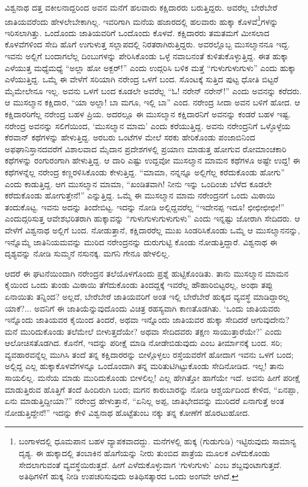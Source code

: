 ವಿಶ್ವನಾಥ ದತ್ತ ವಕೀಲನಾದ್ದರಿಂದ ಅವನ ಮನೆಗೆ ಹಲವಾರು ಕಕ್ಷಿದಾರರು ಬರುತ್ತಿದ್ದರು. ಅವರೆಲ್ಲ ಬೇರೆಬೇರೆ ಜಾತಿಯವರೆಂದು ಹೇಳಲೇಬೇಕಾಗಿಲ್ಲ. ಇವರಿಗಾಗಿ ಮನೆಯ ಹಜಾರದಲ್ಲಿ ಹಲವಾರು ಹುಕ್ಕಾ ಕೊಳವೆ\footnote{ಬಂಗಾಳದಲ್ಲಿ ಧೂಮಪಾನ ಬಹಳ ವ್ಯಾಪಕವಾದದ್ದು. ಮನೆಗಳಲ್ಲಿ ಹುಕ್ಕ (ಗುಡುಗುಡಿ) ಇಟ್ಟಿರುವುದು ಸಾಮಾನ್ಯ ದೃಶ್ಯ. ಈ ಹುಕ್ಕಾದಲ್ಲಿ ತಂಬಾಕಿನ ಹೊಗೆಯನ್ನು ನೀರು ತುಂಬಿದ ಪಾತ್ರೆಯ ಮೂಲಕ ಎಳೆದುಕೊಂಡು ಸೇದಲಾಗುವಂತೆ ವ್ಯವಸ್ಥೆಯಿರುತ್ತದೆ. ಹೀಗೆ ಎಳೆದುಕೊಳ್ಳುವಾಗ `ಗುಳುಗುಳು' ಎಂಬ ಶಬ್ದವುಂಟಾಗುತ್ತದೆ. ಅತಿಥಿಗಳಿಗೆ ಹುಕ್ಕ ನೀಡಿ ಉಪಚರಿಸುವುದು ಅತಿಥಿಸತ್ಕಾರದ ಒಂದು ಅಂಗವೇ ಆಗಿದೆ.}ಗಳನ್ನು ಇರಿಸಲಾಗಿತ್ತು. ಒಂದೊಂದು ಜಾತಿಯವರಿಗೆ ಒಂದೊಂದು ಕೊಳವೆ. ಕಕ್ಷಿದಾರರು ತಮತಮಗೆ ಮೀಸಲಾದ ಕೊಳವೆಗಳಿಂದ ಸೇದಿ ಹೊಗೆ ಉಗುಳುತ್ತ ಸಲ್ಲಾಪದಲ್ಲಿ ನಿರತರಾಗಿರುತ್ತಿದ್ದರು. ಅವರಲ್ಲೊಬ್ಬ ಮುಸಲ್ಮಾನನೂ ಇದ್ದ. ಇವನು ಅಲ್ಲಿಗೆ ಬಂದಾಗಲೆಲ್ಲ ದಿಂಬುಗಳನ್ನು ಪೇರಿಸಿಕೊಂಡು ಒಳ್ಳೆ ನವಾಬನಂತೆ ಕುಳಿತುಕೊಳ್ಳುತ್ತಿದ್ದ. ಈತ ಹುಕ್ಕಾ ಎಳೆಯುತ್ತ ಮಧ್ಯೆಮಧ್ಯೆ “ಅಲ್ಲಾ ಹೋ ಅಕ್ಬರ್!” ಎಂದು ಉದ್ಗರಿಸಿ ಬಳಿಕ ಮತ್ತೆ “ಗುಳುಗುಳುಗುಳು” ಎಂದು ಹುಕ್ಕಾ ಎಳೆಯುತ್ತಿದ್ದ. ಒಮ್ಮೆ ಈ ವೇಳೆಗೆ ಸರಿಯಾಗಿ ನರೇಂದ್ರ ಒಳಗೆ ಬಂದ. ಸೊಂಟಕ್ಕೆ ಸುತ್ತಿದ ಪುಟ್ಟ ಧೋತಿ ಬಿಟ್ಟರೆ ಮೈಮೇಲೇನೂ ಇಲ್ಲ. ಅವನು ಒಳಗೆ ಬಂದ ಕೂಡಲೇ ಅವರೆಲ್ಲ “ಓ! ನರೇನ್ ನರೇನ್!” ಎಂದು ಅವನನ್ನು ಕರೆದರು. ಆ ಮುಸಲ್ಮಾನ ಕಕ್ಷಿದಾರ, “ಯಾ ಅಲ್ಲಾ! ಬಾ ಮಗೂ, ಇಲ್ಲಿ ಬಾ” ಎಂದ. ನರೇಂದ್ರ ಸೀದಾ ಅವನ ಬಳಿಗೆ ಹೋದ. ಆ ಕಕ್ಷಿದಾರರಿಗೆಲ್ಲ ನರೇಂದ್ರ ಬಹಳ ಪ್ರಿಯ. ಅದರಲ್ಲೂ ಈ ಮುಸಲ್ಮಾನ ಕಕ್ಷಿದಾರನಿಗೆ ಅವನನ್ನು ಕಂಡರೆ ಬಹಳ ಇಷ್ಟ. ನರೇಂದ್ರ ಅವನನ್ನು ಸಲಿಗೆಯಿಂದ, ‘ಮುಸಲ್ಮಾನ ಮಾಮ’ ಎಂದು ಕರೆಯುತ್ತಿದ್ದ. ಅವನು ನರೇಂದ್ರನಿಗೆ ಒಳ್ಳೊಳ್ಳೆಯ ಕೆರವಾನ್ ಕಥೆಗಳನ್ನು ಹೇಳುತ್ತಿದ್ದ. ಅರಬರು ಒಂಟೆಗಳ ಮೇಲೆ ಸರಕು ಹೇರಿಕೊಂಡು ಪಂಜಾಬಿನಿಂದ ಅಫಘಾನಿಸ್ತಾನದವರೆಗೆ ವಿಶಾಲವಾದ ಮೈದಾನ ಪ್ರದೇಶಗಳಲ್ಲಿ ಪ್ರಯಾಣ ಮಾಡುತ್ತ ಹೋಗುವ ರೋಮಾಂಚಕಾರಿ ಕಥೆಗಳನ್ನು ರಂಗುರಂಗಾಗಿ ಹೇಳುತ್ತಿದ್ದ. ಆ ದಾರಿ ಎಷ್ಟು ಉದ್ದವೋ ಮುಸಲ್ಮಾನ ಮಾಮನ ಕಥೆಗಳೂ ಅಷ್ಟೇ ಉದ್ದ! ಈ ಕಥೆಗಳನ್ನೆಲ್ಲ ನರೇಂದ್ರ ಕಣ್ಣರಳಿಸಿಕೊಂಡು ಕೇಳುತ್ತಿದ್ದ. “ಮಾಮಾ, ನನ್ನನ್ನೂ ಅಲ್ಲಿಗೆಲ್ಲ ಕರೆದುಕೊಂಡು ಹೋಗು” ಎಂದು ಕಾಡುತ್ತಿದ್ದ. ಆಗ ಮುಸಲ್ಮಾನ ಮಾಮಾ, “ಖಂಡಿತವಾಗಿ! ನೀನು ಇನ್ನು ಒಂದಿಂಚು ಬೆಳೆದ ಕೂಡಲೇ ಕರೆದುಕೊಂಡು ಹೋಗುತ್ತೇನೆ!” ಎನ್ನುತ್ತಿದ್ದ. ಒಮ್ಮೆ ಈ ಮುಸಲ್ಮಾನ ಮಾಮ ನರೇಂದ್ರನಗೆ ಒಂದು ಮಿಠಾಯಿ ತಂದುಕೊಟ್ಟ. ಇವನು ಅದನ್ನು ತಿಂದೇಬಿಟ್ಟ. ಇದನ್ನು ನೋಡಿ ಅಲ್ಲಿದ್ದವರೆಲ್ಲ “ಇದೇನಪ್ಪ ಇದೂ! ಛೀಛೀಛೀಛೀ!” ಎಂದುದ್ಗರಿಸುತ್ತ ಆವೇಶಭರಿತರಾಗಿ ಹುಕ್ಕಾವನ್ನು “ಗುಳುಗುಳುಗುಳುಗುಳು” ಎಂದು ಇನ್ನಷ್ಟು ಜೋರಾಗಿ ಸೇದಿದರು. ಆ ವೇಳೆಗೆ ವಿಶ್ವನಾಥ ಅಲ್ಲಿಗೆ ಬಂದ. ನೋಡುತ್ತಾನೆ, ಕಕ್ಷಿದಾರರೆಲ್ಲ ಮುಖ ಸಿಂಡರಿಸಿಕೊಂಡು ಒಮ್ಮೆ ಆ ಮುಸಲ್ಮಾನನನ್ನು, ಇನ್ನೊಮ್ಮೆ ಜಾತಿನಿಯಮವನ್ನು ಮುರಿದ ನರೇಂದ್ರನನ್ನು ದುರುಗುಟ್ಟಿ ಕೊಂಡು ನೋಡುತ್ತಿದ್ದಾರೆ. ವಿಶ್ವನಾಥ ಈ ದೃಶ್ಯವನ್ನು ನೋಡಿ ಸುಮ್ಮನೆ ನಸುನಕ್ಕ. ಮಗನಿ ಗೇನೂ ಹೇಳಲಿಲ್ಲ.

ಆದರೆ ಈ ಘಟನೆಯಿಂದಾಗಿ ನರೇಂದ್ರನ ತಲೆಯೊಳಗೊಂದು ಪ್ರಶ್ನೆ ಹುಟ್ಟಿಕೊಂಡಿತು. ತಾನು ಮುಸಲ್ಮಾನ ಮಾಮನ ಕೈಯಿಂದ ಒಂದು ತುಂಡು ಮಿಠಾಯಿ ತೆಗೆದುಕೊಂಡು ತಿಂದದ್ದಕ್ಕೆ ಇವರೆಲ್ಲ ಹೌಹಾರಿಬಿಟ್ಟರಲ್ಲ, ಅಂಥಾ ತಪ್ಪು ಏನಾಯಿತು ತನ್ನಿಂದ? ಅಲ್ಲದೆ, ಬೇರೆಬೇರೆ ಜಾತಿಯವರಿಗೆ ಅಂತ ಇಲ್ಲಿ ಬೇರೆಬೇರೆ ಹುಕ್ಕದ ವ್ಯವಸ್ಥೆ ಮಾಡಿದ್ದಾರಲ್ಲ ಯಾಕೆ?... ಅವನಿಗೆ ಈ ಜಾತಿಯೆನ್ನುವುದೊಂದು ವಿಚಿತ್ರ ರಹಸ್ಯವಾಗಿ ಕಾಣತೊಡಗಿತು. ‘ಒಂದು ಜಾತಿಯವರು ಇನ್ನೊಂದು ಜಾತಿಯವರ ಕೈಯಿಂದ ತಿಂದರೆ, ಅಥವಾ ಇನ್ನೊಂದು ಜಾತಿಯವರ ಹುಕ್ಕಾ ಸೇದಿದರೆ ಆಗುವುದೇನು? ಮನೆ ಮುರಿದುಕೊಂಡು ತಲೆಮೇಲೆ ಬೀಳುತ್ತದೆಯೇ? ಅಥವಾ ಸೇದಿದವರು ತಕ್ಷಣ ಸಾಯುತ್ತಾರೆಯೇ?’ ಎಂದು ಆಲೋಚಿಸತೊಡಗಿದ. ಕೊನೆಗೆ, ಇದನ್ನು ಪರೀಕ್ಷೆ ಮಾಡಿ ನೋಡೇಬಿಡುವುದು ಎಂಬ ತೀರ್ಮಾನಕ್ಕೆ ಬಂದ. ಸರಿ; ವ್ಯವಹಾರವನ್ನೆಲ್ಲ ಮುಗಿಸಿ ತಂದೆ ತನ್ನ ಕಕ್ಷಿದಾರರನ್ನು ಬೀಳ್ಗೊಳ್ಳಲು ರಸ್ತೆಯವರೆಗೆ ಹೋದಾಗ ಇವನು ಒಳಗೆ ಬಂದ; ಅಲ್ಲಿದ್ದ ಎಲ್ಲ ಹುಕ್ಕಾಕೊಳವೆಗಳನ್ನೂ ಒಂದೊಂದಾಗಿ ತನ್ನ ಮರಿತುಟಿಗಿಟ್ಟುಕೊಂಡು ಸೇದಿನೋಡಿದ. ಇಲ್ಲ! ತಾನು ಸಾಯಲಿಲ್ಲ. ಮನೆಯ ಮಾಡು ಮುರಿದುಕೊಂಡು ಬೀಳಲಿಲ್ಲ! ಎಲ್ಲ ಹೇಗಿತ್ತೋ ಹಾಗೆಯೇ ಇದೆ. ಅವನು ಹೀಗೆ ಪರೀಕ್ಷೆ ಮಾಡುತ್ತಿರುವ ಹೊತ್ತಿಗೆ ತಂದೆ ಹಿಂದಿರುಗಿ ಬಂದ; ಮಗನ ಕಾರುಬಾರನ್ನು ನೋಡಿ ಆಶ್ಚರ್ಯದಿಂದ ಕೇಳಿದ, “ಏನಪ್ಪಾ, ಏನು ಮಾಡುತ್ತಿದ್ದೀಯಾ?” ನರೇಂದ್ರ ಹೇಳುತ್ತಾನೆ, “ಏನಿಲ್ಲ ಅಪ್ಪ, ಜಾತಿಭೇದವನ್ನು ಮುರಿದರೆ ಏನಾಗುತ್ತೆ ಅಂತ ನೋಡುತ್ತಿದ್ದೇನೆ!” ಇದನ್ನು ಕೇಳಿ ವಿಶ್ವನಾಥ ಹೊಟ್ಟೆತುಂಬ ನಕ್ಕು ತನ್ನ ಕೋಣೆಗೆ ಹೊರಟುಹೋದ.

